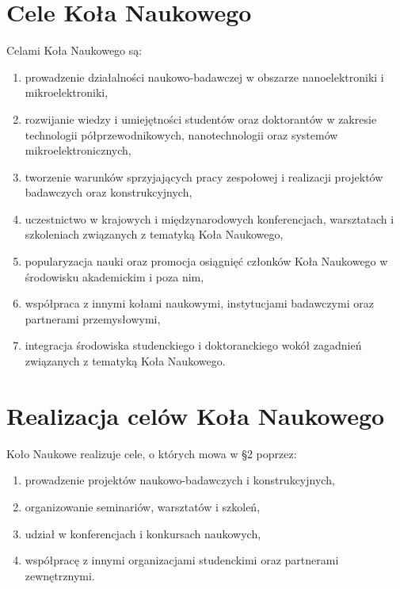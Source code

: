 \documentclass[12pt,a4paper]{article}
\begin{document}
\section{Cele Koła Naukowego}
Celami Koła Naukowego są:
    \begin{enumerate}
        \item prowadzenie działalności naukowo-badawczej w obszarze nanoelektroniki i mikroelektroniki,
        \item rozwijanie wiedzy i umiejętności studentów oraz doktorantów w zakresie technologii półprzewodnikowych, nanotechnologii oraz systemów mikroelektronicznych,
        \item tworzenie warunków sprzyjających pracy zespołowej i realizacji projektów badawczych oraz konstrukcyjnych,
        \item uczestnictwo w krajowych i międzynarodowych konferencjach, warsztatach i szkoleniach związanych z tematyką Koła Naukowego,
        \item popularyzacja nauki oraz promocja osiągnięć członków Koła Naukowego w środowisku akademickim i poza nim,
        \item współpraca z innymi kołami naukowymi, instytucjami badawczymi oraz partnerami przemysłowymi,
        \item integracja środowiska studenckiego i doktoranckiego wokół zagadnień związanych z tematyką Koła Naukowego.
    \end{enumerate}

\newpage

\section{Realizacja celów Koła Naukowego}
Koło Naukowe realizuje cele, o których mowa w \S 2 poprzez:
    \begin{enumerate}
        \item prowadzenie projektów naukowo-badawczych i konstrukcyjnych,
        \item organizowanie seminariów, warsztatów i szkoleń,
        \item udział w konferencjach i konkursach naukowych,
        \item współpracę z innymi organizacjami studenckimi oraz partnerami zewnętrznymi.
    \end{enumerate}
\end{document}
